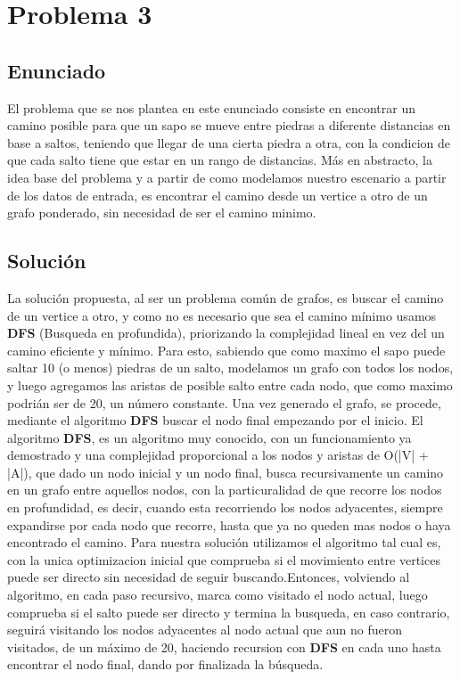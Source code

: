 \section{Problema 3}

\subsection{Enunciado}
El problema que se nos plantea en este enunciado consiste en encontrar un camino posible para que un sapo se mueve entre piedras a diferente distancias en base a saltos, teniendo que llegar de una cierta piedra a otra, con la condicion de que cada salto tiene que estar en un rango de distancias.
Más en abstracto, la idea base del problema y a partir de como modelamos nuestro escenario a partir de los datos de entrada, es encontrar el camino desde un vertice a otro de un grafo ponderado, sin necesidad de ser el camino minimo. 

\subsection{Soluci\'on}

La solución propuesta, al ser un problema común de grafos, es buscar el camino de un vertice a otro, y como no es necesario que sea el camino mínimo usamos \textbf{DFS} (Busqueda en profundida), priorizando la complejidad lineal en vez del un camino eficiente y mínimo. Para esto, sabiendo que como maximo el sapo puede saltar 10 (o menos) piedras de un salto, modelamos un grafo con todos los nodos, y luego agregamos las aristas de posible salto entre cada nodo, que como maximo podrián ser de 20, un número constante.
Una vez generado el grafo, se procede, mediante el algoritmo \textbf{DFS} buscar el nodo final empezando por el inicio. 
El algoritmo \textbf{DFS}, es un algoritmo muy conocido, con un funcionamiento ya demostrado y una complejidad proporcional a los nodos y aristas de O(|V| + |A|), que dado un nodo inicial y un nodo final, busca recursivamente un camino en un grafo entre aquellos nodos, con la particuralidad de que recorre los nodos en profundidad, es decir, cuando esta recorriendo los nodos adyacentes, siempre expandirse por cada nodo que recorre, hasta que ya no queden mas nodos o haya encontrado el camino.
Para nuestra solución utilizamos el algoritmo tal cual es, con la unica optimizacion inicial que comprueba si el movimiento entre vertices puede ser directo sin necesidad de seguir buscando.Entonces, volviendo al algoritmo, en cada paso recursivo, marca como visitado el nodo actual, luego comprueba si el salto puede ser directo y termina la busqueda, en caso contrario, seguirá visitando los nodos adyacentes al nodo actual que aun no fueron visitados, de un máximo de 20, haciendo recursion con \textbf{DFS} en cada uno hasta encontrar el nodo final, dando por finalizada la búsqueda.

